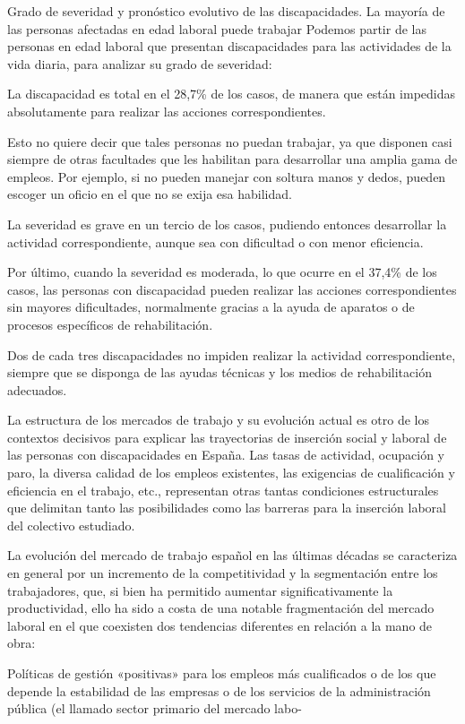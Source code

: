 Grado de severidad y pronóstico evolutivo de las discapacidades. La mayoría de las personas afectadas en edad laboral puede
trabajar
Podemos partir de las personas en edad laboral que presentan discapacidades para las actividades de la vida diaria, para analizar su grado de severidad:

La discapacidad es total en el 28,7\% de los casos, de manera que están impedidas absolutamente para realizar las acciones correspondientes.

Esto no quiere decir que tales personas no puedan trabajar, ya que disponen casi siempre de otras facultades que les habilitan para desarrollar una amplia gama de empleos. Por ejemplo, si no pueden manejar con soltura manos y dedos, pueden escoger un oficio en el que no se exija esa habilidad.

La severidad es grave en un tercio de los casos, pudiendo entonces desarrollar la actividad correspondiente, aunque sea con dificultad o con menor eficiencia.

Por último, cuando la severidad es moderada, lo que ocurre en el 37,4\% de los casos, las personas con discapacidad pueden realizar las acciones correspondientes sin mayores dificultades, normalmente gracias a la ayuda de aparatos o de procesos específicos de rehabilitación.

Dos de cada tres discapacidades no impiden realizar la actividad correspondiente, siempre que se disponga de las ayudas técnicas y los medios de rehabilitación adecuados.
 

La estructura de los mercados de trabajo y su evolución actual es otro de los contextos decisivos para explicar las trayectorias de inserción social y laboral de las personas con discapacidades en España. Las tasas de actividad, ocupación y paro, la diversa calidad de los empleos existentes, las exigencias de cualificación y eficiencia en el trabajo, etc., representan otras tantas condiciones estructurales que delimitan tanto las posibilidades como las barreras para la inserción laboral del colectivo estudiado. 

La evolución del mercado de trabajo español en las últimas décadas se caracteriza en general por un incremento de la competitividad y la segmentación entre los trabajadores, que, si bien ha permitido aumentar significativamente la productividad, ello ha sido a costa de una notable fragmentación del mercado laboral en el que coexisten dos tendencias diferentes en relación a la mano de obra:

Políticas de gestión «positivas» para los empleos más cualificados o de los que depende la estabilidad de las empresas o de los servicios de la administración pública (el llamado sector primario del mercado labo-



